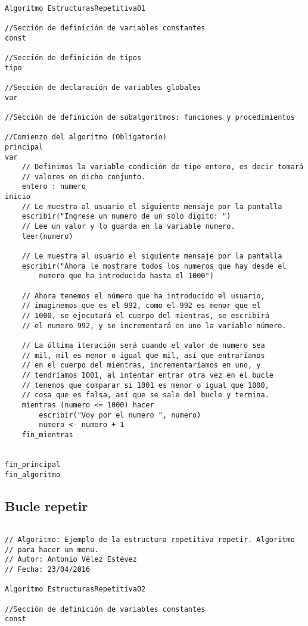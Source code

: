 \documentclass{article}
\begin{document}
\begin{appendices}
\begin{lstlisting}[language = pseudocodigoesp]
 
Algoritmo EstructurasRepetitiva01

//Sección de definición de variables constantes
const 
	
//Sección de definición de tipos
tipo

//Sección de declaración de variables globales	
var

//Sección de definición de subalgoritmos: funciones y procedimientos	

//Comienzo del algoritmo (Obligatorio)
principal	
var
	// Definimos la variable condición de tipo entero, es decir tomará
	// valores en dicho conjunto.
	entero : numero
inicio 	
	// Le muestra al usuario el siguiente mensaje por la pantalla
	escribir("Ingrese un numero de un solo digito: ")
	// Lee un valor y lo guarda en la variable numero.
	leer(numero)
	
	// Le muestra al usuario el siguiente mensaje por la pantalla
	escribir("Ahora le mostrare todos los numeros que hay desde el
        numero que ha introducido hasta el 1000")
	
	// Ahora tenemos el número que ha introducido el usuario,
	// imaginemos que es el 992, como el 992 es menor que el
	// 1000, se ejecutará el cuerpo del mientras, se escribirá
	// el numero 992, y se incrementará en uno la variable número.
	
	// La última iteración será cuando el valor de numero sea
	// mil, mil es menor o igual que mil, así que entraríamos
	// en el cuerpo del mientras, incrementaríamos en uno, y 
	// tendríamos 1001, al intentar entrar otra vez en el bucle
	// tenemos que comparar si 1001 es menor o igual que 1000,
	// cosa que es falsa, así que se sale del bucle y termina.
	mientras (numero <= 1000) hacer
		escribir("Voy por el numero ", numero)
		numero <- numero + 1
	fin_mientras
	

fin_principal
fin_algoritmo
\end{lstlisting}
\subsection{Bucle repetir}
\begin{lstlisting}[language = pseudocodigoesp]

// Algoritmo: Ejemplo de la estructura repetitiva repetir. Algoritmo
// para hacer un menu.
// Autor: Antonio Vélez Estévez
// Fecha: 23/04/2016
  
Algoritmo EstructurasRepetitiva02

//Sección de definición de variables constantes
const 
	

\end{lstlisting}
\end{appendices}
\end{document}
